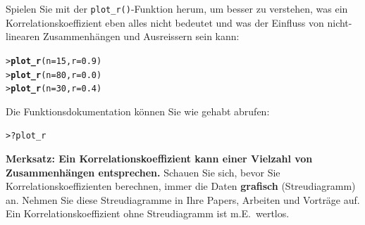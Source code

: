 \documentclass[oneside, 10pt]{book}\usepackage[]{graphicx}\usepackage[]{xcolor}
\makeatletter
\newcommand{\hlnum}[1]{\textcolor[rgb]{0.686,0.059,0.569}{#1}}%
\newcommand{\hlopt}[1]{\textcolor[rgb]{0,0,0}{#1}}%
\newcommand{\hlstd}[1]{\textcolor[rgb]{0.345,0.345,0.345}{#1}}%
\newcommand{\hlkwc}[1]{\textcolor[rgb]{0.333,0.667,0.333}{#1}}%
\newcommand{\hlkwd}[1]{\textcolor[rgb]{0.737,0.353,0.396}{\textbf{#1}}}%
\newenvironment{kframe}{%
 \def\at@end@of@kframe{}%
 \ifinner\ifhmode%
  \def\at@end@of@kframe{\end{minipage}}%
  \begin{minipage}{\columnwidth}%
 \fi\fi%
 \def\FrameCommand##1{\hskip\@totalleftmargin \hskip-\fboxsep
 \colorbox{shadecolor}{##1}\hskip-\fboxsep
     \hskip-\linewidth \hskip-\@totalleftmargin \hskip\columnwidth}%
 \MakeFramed {\advance\hsize-\width
   \@totalleftmargin\z@ \linewidth\hsize
   \@setminipage}}%
 {\par\unskip\endMakeFramed%
 \at@end@of@kframe}
\newenvironment{knitrout}{}{} %
\makeatother
\begin{document}
Spielen Sie mit der \texttt{plot\_r()}-Funktion herum,
um besser zu verstehen, was ein Korrelationskoeffizient eben alles nicht bedeutet
und was der Einfluss von nicht-linearen Zusammenhängen und Ausreissern sein kann:
\begin{knitrout}
\color{fgcolor}\begin{kframe}
\begin{alltt}
\hlstd{> }\hlkwd{plot_r}\hlstd{(}\hlkwc{n} \hlstd{=} \hlnum{15}\hlstd{,} \hlkwc{r} \hlstd{=} \hlnum{0.9}\hlstd{)}
\hlstd{> }\hlkwd{plot_r}\hlstd{(}\hlkwc{n} \hlstd{=} \hlnum{80}\hlstd{,} \hlkwc{r} \hlstd{=} \hlnum{0.0}\hlstd{)}
\hlstd{> }\hlkwd{plot_r}\hlstd{(}\hlkwc{n} \hlstd{=} \hlnum{30}\hlstd{,} \hlkwc{r} \hlstd{=} \hlnum{0.4}\hlstd{)}
\end{alltt}
\end{kframe}
\end{knitrout}
Die Funktionsdokumentation können Sie wie gehabt abrufen:
\begin{knitrout}
\color{fgcolor}\begin{kframe}
\begin{alltt}
\hlstd{> }\hlopt{?}\hlstd{plot_r}
\end{alltt}
\end{kframe}
\end{knitrout}


\medskip

\begin{framed}
\noindent \textbf{Merksatz: Ein Korrelationskoeffizient kann einer Vielzahl von Zusammenhängen entsprechen.}
Schauen Sie sich, bevor Sie Korrelationskoeffizienten berechnen, immer die Daten \textbf{grafisch}
(Streudiagramm) an.
Nehmen Sie diese Streudiagramme in Ihre Papers, Arbeiten und Vorträge auf.
Ein Korrelationskoeffizient ohne Streudiagramm ist m.E.\ wertlos.
\end{framed}
\end{document}
